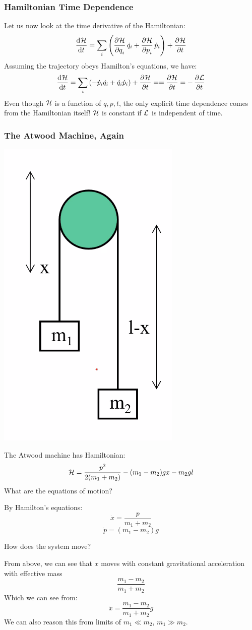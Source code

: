 \subsubsection{Hamiltonian Time Dependence}
Let us now look at the time derivative of the Hamiltonian:
\[\dod{\mathcal{H}}{t} = \sum_i\left(\dpd{\mathcal{H}}{q_i}\dot{q}_i + \dpd{\HH}{p_i}\dot{p}_i\right)  + \dpd{\HH}{t}\]
Assuming the trajectory obeys Hamilton's equations, we have:
\[\dod{\mathcal{H}}{t} = \sum_i\left(-\dot{p}_i\dot{q}_i + \dot{q}_i\dot{p}_i\right) + \dpd{\HH}{t} = = \dpd{\HH}{t} = - \dpd{\LL}{t} \]
Even though $\mathcal{H}$ is a function of $q, p, t$, the only explicit time dependence comes from the Hamiltonian itself! $\mathcal{H}$ is constant if $\mathcal{L}$ is independent of time.

\subsubsection{The Atwood Machine, Again}
\begin{center}
    \includegraphics[scale=0.5]{Lecture-23/l23-img1.png}
\end{center}
The Atwood machine has Hamiltonian:
\[\mathcal{H} = \frac{p^2}{2(m_1 + m_2)} - (m_1 - m_2)gx - m_2gl\]
What are the equations of motion?
\begin{s}
By Hamilton's equations:
\[\dot{x} = \frac{p}{m_1 + m_2}\]
\[\dot{p} = (m_1 - m_2)g\]
\end{s}
How does the system move?
\begin{s}
From above, we can see that $x$ moves with constant gravitational acceleration with effective mass \[\frac{m_1 - m_2}{m_1 + m_2}\]
Which we can see from:
\[\ddot{x} = \frac{m_1 - m_2}{m_1 + m_2}g\]
We can also reason this from limits of $m_1 \ll m_2$, $m_1 \gg m_2$.
\end{s}

